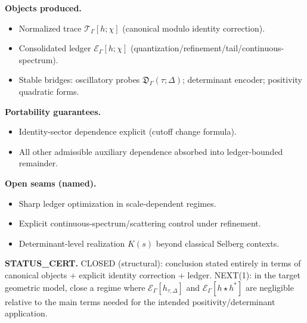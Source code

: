 \noindent\textbf{Objects produced.}
\begin{itemize}
\item Normalized trace $\mathcal T_\Gamma[h;\chi]$ (canonical modulo identity correction).
\item Consolidated ledger $\mathcal E_\Gamma[h;\chi]$ (quantization/refinement/tail/continuous-spectrum).
\item Stable bridges: oscillatory probes $\mathfrak D_\Gamma(\tau;\Delta)$; determinant encoder; positivity quadratic forms.
\end{itemize}

\noindent\textbf{Portability guarantees.}
\begin{itemize}
\item Identity-sector dependence explicit (cutoff change formula).
\item All other admissible auxiliary dependence absorbed into ledger-bounded remainder.
\end{itemize}

\noindent\textbf{Open seams (named).}
\begin{itemize}
\item Sharp ledger optimization in scale-dependent regimes.
\item Explicit continuous-spectrum/scattering control under refinement.
\item Determinant-level realization $K(s)$ beyond classical Selberg contexts.
\end{itemize}

\noindent\textbf{STATUS\_CERT.}
CLOSED (structural): conclusion stated entirely in terms of canonical objects + explicit identity correction + ledger.
NEXT(1): in the target geometric model, close a regime where $\mathcal E_\Gamma[h_{\tau,\Delta}]$ and $\mathcal E_\Gamma[h\star h^\ast]$
are negligible relative to the main terms needed for the intended positivity/determinant application.

